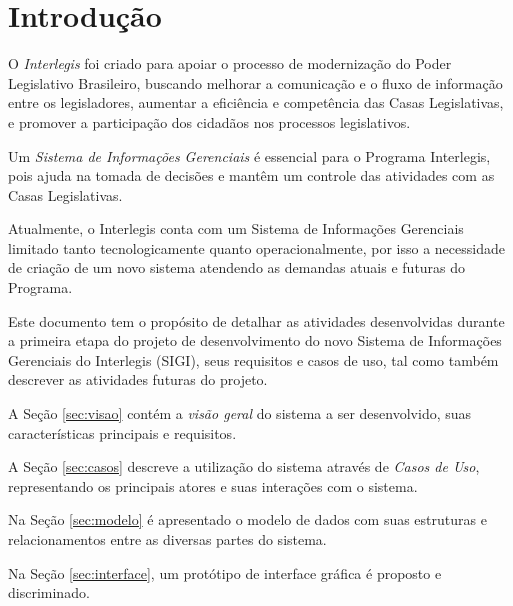 %
%

\section{Introdução}
O \emph{Interlegis} foi criado para apoiar o processo de modernização
do Poder Legislativo Brasileiro, buscando melhorar a comunicação e o
fluxo de informação entre os legisladores, aumentar a eficiência e
competência das Casas Legislativas, e promover a participação dos
cidadãos nos processos legislativos.

Um \emph{Sistema de Informações Gerenciais} é essencial para o
Programa Interlegis, pois ajuda na tomada de decisões e mantêm um
controle das atividades com as Casas Legislativas.

Atualmente, o Interlegis conta com um Sistema de Informações
Gerenciais limitado tanto tecnologicamente quanto operacionalmente,
por isso a necessidade de criação de um novo sistema atendendo as
demandas atuais e futuras do Programa.

Este documento tem o propósito de detalhar as atividades desenvolvidas
durante a primeira etapa do projeto de desenvolvimento do novo Sistema
de Informações Gerenciais do Interlegis (SIGI), seus requisitos e
casos de uso, tal como também descrever as atividades futuras do
projeto.

A Seção \ref{sec:visao} contém a \emph{visão geral} do sistema a ser
desenvolvido, suas características principais e requisitos.

A Seção \ref{sec:casos} descreve a utilização do sistema através de
\emph{Casos de Uso}, representando os principais atores e suas
interações com o sistema.

Na Seção \ref{sec:modelo} é apresentado o modelo de dados com suas
estruturas e relacionamentos entre as diversas partes do sistema.

Na Seção \ref{sec:interface}, um protótipo de interface gráfica é
proposto e discriminado.


